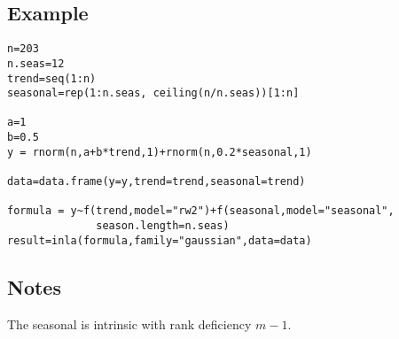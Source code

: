\documentclass[a4paper,11pt]{article}
\begin{document}
\subsection*{Example}

\begin{verbatim}
n=203
n.seas=12
trend=seq(1:n)
seasonal=rep(1:n.seas, ceiling(n/n.seas))[1:n]

a=1
b=0.5
y = rnorm(n,a+b*trend,1)+rnorm(n,0.2*seasonal,1)

data=data.frame(y=y,trend=trend,seasonal=trend)

formula = y~f(trend,model="rw2")+f(seasonal,model="seasonal",
              season.length=n.seas)
result=inla(formula,family="gaussian",data=data)
\end{verbatim}


\subsection*{Notes}

The seasonal is intrinsic with rank deficiency $m-1$.
\end{document}
